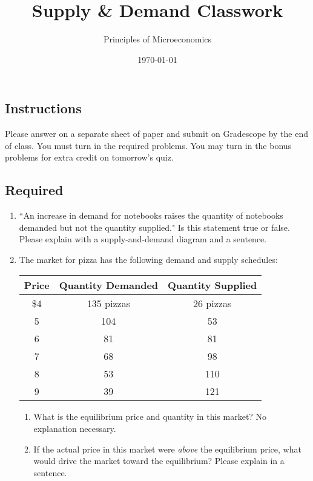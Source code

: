 \documentclass{article}
\title{Supply \& Demand Classwork}
\author{Principles of Microeconomics}
\date{\today}
\begin{document}
\maketitle

\subsection*{Instructions} Please answer on a separate sheet of paper and submit on Gradescope by the end of class. You must turn in the required problems. You may turn in the bonus problems for extra credit on tomorrow's quiz.

\subsection*{Required}

\begin{enumerate}

\item ``An increase in demand for notebooks raises the quantity of notebooks demanded but not the quantity supplied." Is this statement true or false. Please explain with a supply-and-demand diagram and a sentence.

\item The market for pizza has the following demand and supply schedules:

	\begin{center}
	\begin{tabular}{c c c}
	\textbf{Price} & \textbf{Quantity Demanded} & \textbf{Quantity Supplied} \\
	\hline
	\$4 & 135 pizzas & 26 pizzas \\
	5 & 104 & 53 \\
	6 & 81 & 81 \\
	7 & 68 & 98 \\
	8 & 53 & 110 \\
	9 & 39 & 121
	\end{tabular}
	\end{center}

	\begin{enumerate}
	
	\item What is the equilibrium price and quantity in this market? No explanation necessary. 
	
	\item If the actual price in this market were \textit{above} the equilibrium price, what would drive the market toward the equilibrium? Please explain in a sentence.
	

\end{enumerate}
\end{enumerate}
\end{document}
